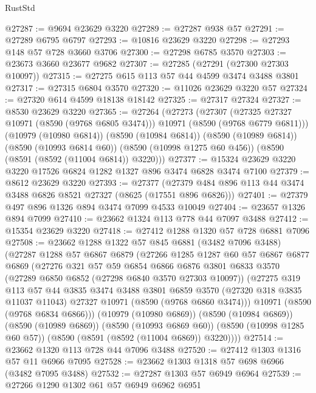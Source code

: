 \begin{lexlean}{RustStd}
\begin{coremodule}
@27287 := @9694 @23629 @3220
@27289 := @27287 @938 @57
@27291 := @27289 @6795 @6797
@27293 := @10816 @23629 @3220
@27298 := @27293 @148 @57 @728 @3660 @3706
@27300 := @27298 @6785 @3570
@27303 := @23673 @3660 @23677 @9682
@27307 := @27285 (@27291 (@27300 @27303 @10097))
@27315 := @27275 @615 @113 @57 @44 @4599 @3474 @3488 @3801
@27317 := @27315 @6804 @3570
@27320 := @11026 @23629 @3220 @57
@27324 := @27320 @614 @4599 @18138 @18142
@27325 := @27317 @27324
@27327 := @8530 @23629 @3220
@27365 := @27264
    (@27273
      (@27307 (@27325 @27327 @10971 (@8590 (@9768 @6805 @3474))) @10971 (@8590 (@9768 @6779 @6811)))
      (@10979 (@10980 @6814))
      (@8590 (@10984 @6814))
      (@8590 (@10989 @6814))
      (@8590 (@10993 @6814 @60))
      (@8590 (@10998 @1275 @60 @456))
      (@8590 (@8591 (@8592 (@11004 @6814)) @3220)))
@27377 := @15324 @23629 @3220 @3220 @17526 @6824 @1282 @1327 @896 @3474 @6828 @3474 @7100
@27379 := @8612 @23629 @3220
@27393 := @27377
    (@27379 @484 @896 @113 @44 @3474 @3488 @6826 @8521 @27327 (@8625 (@17551 @896 @6826)))
@27401 := @27379 @497 @896 @1326 @894 @3474 @7099 @4533 @10049
@27404 := @23657 @1326 @894 @7099
@27410 := @23662 @1324 @113 @778 @44 @7097 @3488
@27412 := @15354 @23629 @3220
@27418 := @27412 @1288 @1320 @57 @728 @6881 @7096
@27508 := @23662
    @1288
    @1322
    @57
    @845
    @6881
    (@3482 @7096 @3488)
    (@27287
      @1288
      @57
      @6867
      @6879
      (@27266
        @1285
        @1287
        @60
        @57
        @6867
        @6877
        @6869
        (@27276
          @321
          @57
          @59
          @6854
          @6866
          @6876
          @3801
          @6833
          @3570
          (@27289 @6850 @6852 (@27298 @6840 @3570 @27303 @10097))
          (@27275
            @319
            @113
            @57
            @44
            @3835
            @3474
            @3488
            @3801
            @6859
            @3570
            (@27320 @318 @3835 @11037 @11043)
            @27327
            @10971
            (@8590 (@9768 @6860 @3474)))
          @10971
          (@8590 (@9768 @6834 @6866)))
        (@10979 (@10980 @6869))
        (@8590 (@10984 @6869))
        (@8590 (@10989 @6869))
        (@8590 (@10993 @6869 @60))
        (@8590 (@10998 @1285 @60 @57))
        (@8590 (@8591 (@8592 (@11004 @6869)) @3220))))
@27514 := @23662 @1320 @113 @728 @44 @7096 @3488
@27520 := @27412 @1303 @1316 @57 @11 @6966 @7095
@27528 := @23662 @1303 @1318 @57 @698 @6966 (@3482 @7095 @3488)
@27532 := @27287 @1303 @57 @6949 @6964
@27539 := @27266 @1290 @1302 @61 @57 @6949 @6962 @6951

\end{coremodule}
\end{lexlean}
